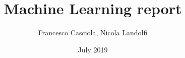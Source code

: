 \documentclass[a4paper,12pt]{book}
\begin{document}
\author{Francesco Casciola, Nicola Landolfi}
\title{Machine Learning report}
\date{July 2019}

\frontmatter
\maketitle
\tableofcontents

\mainmatter




\backmatter
{}

\end{document}
